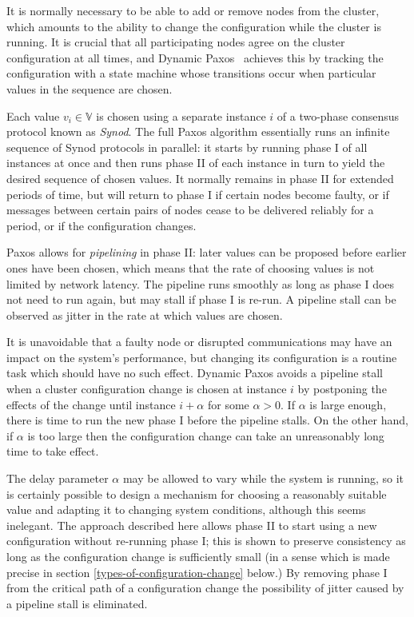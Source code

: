 \documentclass[journal]{IEEEtran}
\begin{document}
It is normally necessary to be able to add or remove nodes from the cluster,
which amounts to the ability to change the configuration while the cluster is
running. It is crucial that all participating nodes agree on the cluster
configuration at all times, and Dynamic Paxos~\cite{cheap-paxos} achieves this
by tracking the configuration with a state machine whose transitions occur when
particular values in the sequence are chosen.

Each value $v_i \in \mathbb V$ is chosen using a separate instance $i$ of a
two-phase consensus protocol known as \textit{Synod}. The full Paxos algorithm
essentially runs an infinite sequence of Synod protocols in parallel: it starts
by running phase I of all instances at once and then runs phase II of each
instance in turn to yield the desired sequence of chosen values. It normally
remains in phase II for extended periods of time, but will return to phase I if
certain nodes become faulty, or if messages between certain pairs of nodes
cease to be delivered reliably for a period, or if the configuration changes.

Paxos allows for \textit{pipelining} \cite{smart} in phase II: later values can
be proposed before earlier ones have been chosen, which means that the rate of
choosing values is not limited by network latency. The pipeline runs smoothly
as long as phase I does not need to run again, but may stall if phase I is
re-run. A pipeline stall can be observed as jitter in the rate at which values
are chosen.

It is unavoidable that a faulty node or disrupted communications may have an
impact on the system's performance, but changing its configuration is a routine
task which should have no such effect. Dynamic Paxos avoids a pipeline stall
when a cluster configuration change is chosen at instance $i$ by postponing the
effects of the change until instance $i + \alpha$ for some $\alpha > 0$. If
$\alpha$ is large enough, there is time to run the new phase I before the
pipeline stalls.  On the other hand, if $\alpha$ is too large then the
configuration change can take an unreasonably long time to take effect.

The delay parameter $\alpha$ may be allowed to vary while the system is
running, so it is certainly possible to design a mechanism for choosing a
reasonably suitable value and adapting it to changing system conditions,
although this seems inelegant\cite{reconfiguring-a-state-machine}.  The
approach described here allows phase II to start using a new configuration
without re-running phase I; this is shown to preserve consistency as long as
the configuration change is sufficiently small (in a sense which is made
precise in section \ref{types-of-configuration-change} below.) By removing
phase I from the critical path of a configuration change the possibility of
jitter caused by a pipeline stall is eliminated.
\end{document}

